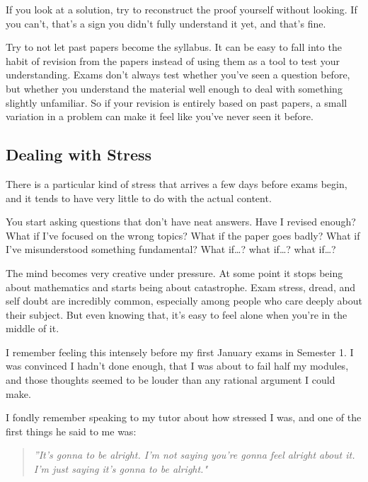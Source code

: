 If you look at a solution, try to reconstruct the proof yourself without looking. If you can't, that's a sign you didn't fully understand it yet, and that's fine. 

Try to not let past papers become the syllabus. It can be easy to fall into the habit of revision from the papers instead of using them as a tool to test your understanding. Exams don't always test whether you've seen a question before, but whether you understand the material well enough to deal with something slightly unfamiliar. So if your revision is entirely based on past papers, a small variation in a problem can make it feel like you've never seen it before.

\subsection{Dealing with Stress}

There is a particular kind of stress that arrives a few days before exams begin, and it tends to have very little to do with the actual content.

You start asking questions that don’t have neat answers. Have I revised enough? What if I’ve focused on the wrong topics? What if the paper goes badly? What if I’ve misunderstood something fundamental? What if…? what if…? what if…? 

The mind becomes very creative under pressure. At some point it stops being about mathematics and starts being about catastrophe. Exam stress, dread, and self doubt are incredibly common, especially among people who care deeply about their subject. But even knowing that, it’s easy to feel alone when you’re in the middle of it.

I remember feeling this intensely before my first January exams in Semester 1. I was convinced I hadn’t done enough, that I was about to fail half my modules, and those thoughts seemed to be louder than any rational argument I could make.

I fondly remember speaking to my tutor about how stressed I was, and one of the first things he said to me was: 

\begin{quote}
    \textit{''It’s gonna to be alright. I’m not saying you’re gonna feel alright about it. I’m just saying it’s gonna to be alright."}
\end{quote}

